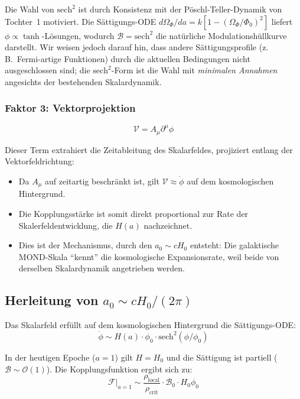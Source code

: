 \documentclass[aps,prd,twocolumn,superscriptaddress,nofootinbib]{revtex4-2}
\begin{document}
Die Wahl von $\mathrm{sech}^2$ ist durch Konsistenz mit der P\"oschl-Teller-Dynamik von Tochter~1 motiviert. Die S\"attigungs-ODE $d\Omega_\Phi/da = k[1 - (\Omega_\Phi/\Phi_0)^2]$ liefert $\phi \propto \tanh$-L\"osungen, wodurch $\mathcal{B} = \mathrm{sech}^2$ die nat\"urliche Modulationsh\"ullkurve darstellt. Wir weisen jedoch darauf hin, dass andere S\"attigungsprofile (z.\,B.\ Fermi-artige Funktionen) durch die aktuellen Bedingungen nicht ausgeschlossen sind; die $\mathrm{sech}^2$-Form ist die Wahl mit \textit{minimalen Annahmen} angesichts der bestehenden Skalardynamik.

\subsubsection{Faktor 3: Vektorprojektion}

\begin{equation}
\mathcal{V} = A_\mu \partial^\mu \phi
\label{eq:V_projection}
\end{equation}

Dieser Term extrahiert die Zeitableitung des Skalarfeldes, projiziert entlang der Vektorfeldrichtung:
\begin{itemize}
\item Da $A_\mu$ auf zeitartig beschr\"ankt ist, gilt $\mathcal{V} \approx \dot{\phi}$ auf dem kosmologischen Hintergrund.
\item Die Kopplungsst\"arke ist somit direkt proportional zur Rate der Skalerfeldentwicklung, die $H(a)$ nachzeichnet.
\item Dies ist der Mechanismus, durch den $a_0 \sim cH_0$ entsteht: Die galaktische MOND-Skala ``kennt'' die kosmologische Expansionsrate, weil beide von derselben Skalardynamik angetrieben werden.
\end{itemize}

\subsection{Herleitung von $a_0 \sim cH_0/(2\pi)$}
\label{sec:a0_derivation}

Das Skalarfeld erf\"ullt auf dem kosmologischen Hintergrund die S\"attigungs-ODE:
\begin{equation}
\dot{\phi} \sim H(a) \cdot \phi_0 \cdot \mathrm{sech}^2(\phi/\phi_0)
\end{equation}

In der heutigen Epoche ($a = 1$) gilt $H = H_0$ und die S\"attigung ist partiell ($\mathcal{B} \sim \mathcal{O}(1)$). Die Kopplungsfunktion ergibt sich zu:
\begin{equation}
\mathcal{F}\big|_{a=1} \sim \frac{\rho_{\mathrm{local}}}{\rho_{\mathrm{crit}}} \cdot \mathcal{B}_0 \cdot H_0 \phi_0
\end{equation}
\end{document}
